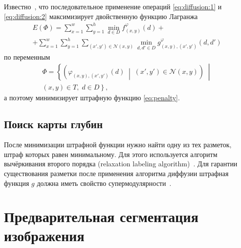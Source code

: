 \documentclass{ConfFTI}
\begin{document}
Известно~\cite{savchynskyy},
что последовательное применение операций \eqref{eq:diffusion:1}
и \eqref{eq:diffusion:2} максимизирует двойственную функцию Лагранжа
\begin{equation*}
\begin{gathered}
    E \left( \Phi \right) =
    \sum \limits_{x = 1}^w
        \sum \limits_{y = 1}^h
            \min \limits_{d \in D}
                f_{\left(x, y \right)}^{\varphi} \left( d\right) + \\
    + \sum \limits_{x = 1}^w
        \sum \limits_{y = 1}^h
            \sum \limits_{\left(x', y'\right)\in \mathcal{N}\left(x, y \right)}
                \min \limits_{d, d' \in D}
                    g_{\left(x, y \right), \left(x', y' \right)}^{\varphi} \left(
                        d, d'
                    \right)
\end{gathered}
\end{equation*}
по переменным
\begin{equation*}
\begin{gathered}
    \Phi = \left\{
        \left(
            \varphi_{\left(x, y \right), \left(x', y'\right)} \left(
                d
            \right) \; \middle| \;
            \left(x', y' \right) \in \mathcal{N}\left(x,y\right)
        \right) \; \middle| \right. \\
        \left. \left(x, y \right) \in T, \;
        d \in D
    \right\},
\end{gathered}
\end{equation*}
а поэтому минимизирует штрафную функцию \eqref{eq:penalty}.

\subsection{Поиск карты глубин}

После минимизации штрафной функции нужно найти одну из тех разметок,
штраф которых равен минимальному.
Для этого используется алгоритм вычёркивания второго порядка
(relaxation labeling algorithm)~\cite{savchynskyy}.
Для гарантии существования разметки после применения
алгоритма диффузии штрафная функция $g$
должна иметь свойство супермодулярности~\cite{crossing:out:shlezinger}.

\section{Предварительная сегментация изображения}
\end{document}
